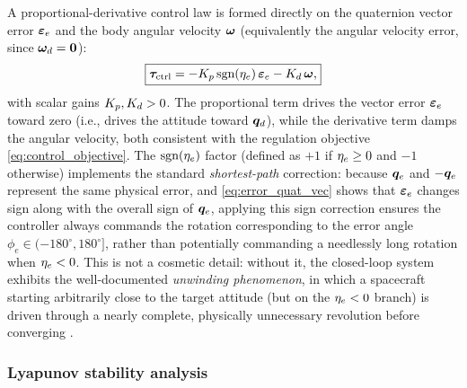 A proportional-derivative control law is formed directly on the quaternion vector error $\bm{\varepsilon}_e$ and the body angular velocity $\bm{\omega}$ (equivalently the angular velocity error, since $\bm{\omega}_d=\bm{0}$):
\begin{equation}
    \boxed{\bm{\tau}_{\text{ctrl}} = -K_{p}\,\text{sgn}(\eta_e)\,\bm{\varepsilon}_e - K_{d}\,\bm{\omega},}
    \label{eq:pd_law}
\end{equation}
with scalar gains $K_{p},K_{d}>0$. The proportional term drives the vector error $\bm{\varepsilon}_e$ toward zero (i.e., drives the attitude toward $\bm{q}_d$), while the derivative term damps the angular velocity, both consistent with the regulation objective \cref{eq:control_objective}. The $\text{sgn}(\eta_e)$ factor (defined as $+1$ if $\eta_e\geq0$ and $-1$ otherwise) implements the standard \emph{shortest-path} correction: because $\bm{q}_{e}$ and $-\bm{q}_{e}$ represent the same physical error, and \cref{eq:error_quat_vec} shows that $\bm{\varepsilon}_e$ changes sign along with the overall sign of $\bm{q}_{e}$, applying this sign correction ensures the controller always commands the rotation corresponding to the error angle $\phi_e\in(-180^\circ,180^\circ]$, rather than potentially commanding a needlessly long rotation when $\eta_e<0$. This is not a cosmetic detail: without it, the closed-loop system exhibits the well-documented \emph{unwinding phenomenon}, in which a spacecraft starting arbitrarily close to the target attitude (but on the $\eta_e<0$ branch) is driven through a nearly complete, physically unnecessary revolution before converging \cite{bhat2000, wie1985}.

\subsubsection{Lyapunov stability analysis}

